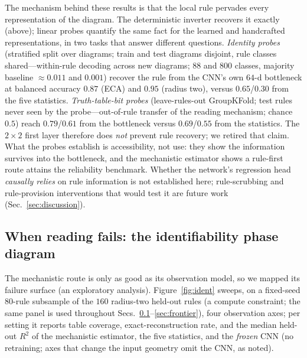 \documentclass[aip,cha,amsmath,amssymb,reprint,floatfix]{revtex4-2}
\newcommand{\rtwo}{$R^2$}
\begin{document}
The mechanism behind these results is that the local rule pervades every
representation of the diagram. The deterministic inverter recovers it exactly
(above); linear probes quantify the same fact for the learned and handcrafted
representations, in two tasks that answer different questions. \emph{Identity probes} (stratified split over diagrams;
train and test diagrams disjoint, rule classes shared---within-rule decoding
across new diagrams; $88$ and $800$ classes, majority baseline $\approx0.011$
and $0.001$) recover the rule from the CNN's own $64$-d bottleneck at balanced
accuracy $0.87$ (ECA) and $0.95$ (radius two), versus $0.65$/$0.30$ from the
five statistics. \emph{Truth-table-bit probes} (leave-rules-out GroupKFold;
test rules never seen by the probe---out-of-rule transfer of the reading
mechanism; chance $0.5$) reach $0.79$/$0.61$ from the bottleneck versus
$0.69$/$0.55$ from the statistics. The $2\times2$ first layer therefore does
\emph{not} prevent rule recovery; we retired that claim. What the probes
establish is accessibility, not use: they show the information survives into
the bottleneck, and the mechanistic estimator shows a rule-first route attains
the reliability benchmark. Whether the network's regression head \emph{causally
relies} on rule information is not established here; rule-scrubbing and
rule-provision interventions that would test it are future work
(Sec.~\ref{sec:discussion}).

\subsection{When reading fails: the identifiability phase diagram}
\label{sec:identifiability}

The mechanistic route is only as good as its observation model, so we mapped
its failure surface (an exploratory analysis). Figure~\ref{fig:ident} sweeps, on
a fixed-seed $80$-rule subsample of the $160$ radius-two held-out rules (a
compute constraint; the same panel is used throughout
Secs.~\ref{sec:identifiability}--\ref{sec:frontier}), four observation axes;
per setting it reports
table coverage, exact-reconstruction rate, and the median held-out \rtwo{} of
the mechanistic estimator, the five statistics, and the \emph{frozen} CNN (no
retraining; axes that change the input geometry omit the CNN, as noted).
\end{document}
